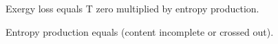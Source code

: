 Exergy loss equals T zero multiplied by entropy production.  

Entropy production equals (content incomplete or crossed out).